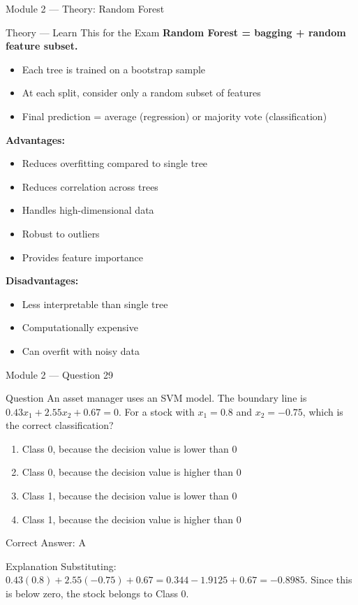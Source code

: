 \documentclass[aspectratio=169,10pt]{beamer}
\newcommand{\question}[1]{%
	\begin{block}{Question}
		#1
	\end{block}
}
\newcommand{\options}[4]{%
	\begin{enumerate}[label=\Alph*.,leftmargin=*]
		\item #1
		\item #2
		\item #3
		\item #4
	\end{enumerate}
}
\newcommand{\answerbox}[1]{%
	\begin{exampleblock}{Correct Answer: #1}
	\end{exampleblock}
}
\newcommand{\explain}[1]{%
	\begin{block}{Explanation}
		\small #1
	\end{block}
}
\newcommand{\theory}[1]{%
	\begin{block}{Theory --- Learn This for the Exam}
		\small #1
	\end{block}
}
\begin{document}
	\begin{frame}{Module 2 --- Theory: Random Forest}
		\theory{
			\textbf{Random Forest = bagging + random feature subset.}
			\begin{itemize}
				\item Each tree is trained on a bootstrap sample
				\item At each split, consider only a random subset of features
				\item Final prediction = average (regression) or majority vote (classification)
			\end{itemize}
			\textbf{Advantages:}
			\begin{itemize}
				\item Reduces overfitting compared to single tree
				\item Reduces correlation across trees
				\item Handles high-dimensional data
				\item Robust to outliers
				\item Provides feature importance
			\end{itemize}
			\textbf{Disadvantages:}
			\begin{itemize}
				\item Less interpretable than single tree
				\item Computationally expensive
				\item Can overfit with noisy data
			\end{itemize}
		}
	\end{frame}
	
	\begin{frame}{Module 2 --- Question 29}
		\question{An asset manager uses an SVM model. The boundary line is $0.43x_1 + 2.55x_2 + 0.67 = 0$. For a stock with $x_1 = 0.8$ and $x_2 = -0.75$, which is the correct classification?}
		\options{Class 0, because the decision value is lower than 0}{Class 0, because the decision value is higher than 0}{Class 1, because the decision value is lower than 0}{Class 1, because the decision value is higher than 0}
		\answerbox{A}
		\explain{Substituting: $0.43(0.8) + 2.55(-0.75) + 0.67 = 0.344 - 1.9125 + 0.67 = -0.8985$. Since this is below zero, the stock belongs to Class 0.}
	\end{frame}
	
\end{document}
